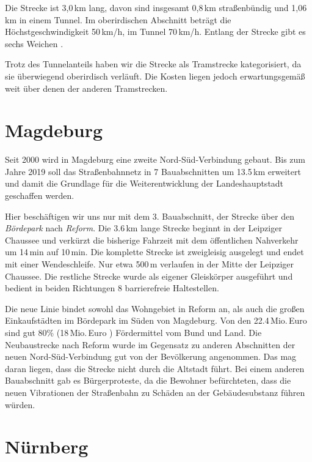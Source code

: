 Die Strecke ist 3,0\,km lang, davon sind insgesamt 0,8\,km straßenbündig und 1,06\,km in einem Tunnel.
Im oberirdischen Abschnitt beträgt die Höchst\-ge\-schwin\-dig\-keit 50\,km/h, im Tunnel 70\,km/h.
Entlang der Strecke gibt es sechs Weichen \cite{u15mail}.

Trotz des Tunnelanteils haben wir die Strecke als Tramstrecke kategorisiert, da sie überwiegend oberirdisch verläuft. Die Kosten liegen jedoch erwartungsgemäß weit über denen der anderen Tramstrecken.

\section{Magdeburg}

Seit 2000 wird in Magdeburg eine zweite Nord-Süd-Verbindung
gebaut. Bis zum Jahre 2019 soll das Straßenbahnnetz in 7
Bauabschnitten um 13.5\,km erweitert und damit die Grundlage
für die Weiterentwicklung der Landeshauptstadt geschaffen
werden. \cite{mvbNordSued}

Hier beschäftigen wir uns nur mit dem 3. Bauabschnitt, der Strecke
über den \textit{Bördepark} nach \textit{Reform}. Die 3.6\,km lange
Strecke beginnt in der Leipziger Chaussee und verkürzt die bisherige
Fahrzeit mit dem öffentlichen Nahverkehr um 14\,min auf 10\,min. Die
komplette Strecke ist zweigleisig ausgelegt und endet mit einer
Wendeschleife. Nur etwa 500\,m verlaufen in der Mitte der Leipziger
Chaussee. Die restliche Strecke wurde als eigener Gleiskörper
ausgeführt und bedient in beiden Richtungen 8 barrierefreie
Haltestellen. \cite{ba3reform}

Die neue Linie bindet sowohl das Wohngebiet in Reform an, als auch die
großen Einkaufstädten im Bördepark im Süden von Magdeburg. Von den
22.4\,Mio.\,Euro \cite{volksstimme2009} sind gut 80\% (18\,Mio.\,Euro
\cite{ba3reform}) Fördermittel vom Bund und Land. Die Neubaustrecke
nach Reform wurde im Gegensatz zu anderen Abschnitten der neuen
Nord-Süd-Verbindung gut von der Bevölkerung angenommen. Das mag
daran liegen, dass die Strecke nicht durch die Altstadt führt. Bei
einem anderen Bauabschnitt gab es Bürgerproteste, da die Bewohner
befürchteten, dass die neuen Vibrationen der Straßenbahn zu Schäden an
der Gebäudesubstanz führen würden. \cite{volksstimme2008}

\section{Nürnberg}

